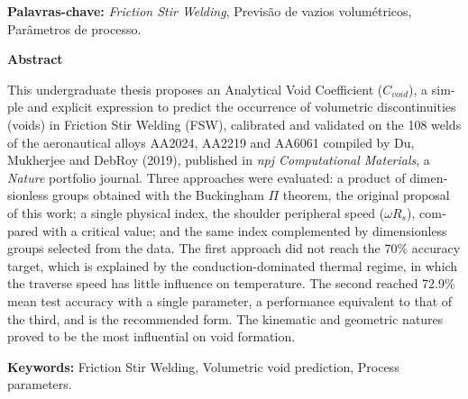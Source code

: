 \documentclass[12pt,openany]{report}
\begin{document}
\vspace{1.0cm}
\noindent \textbf{Palavras-chave:} \textit{Friction Stir Welding}, Previsão de vazios volumétricos, Parâmetros de processo.

\newpage


\vspace*{2.5cm}

\begin{center}
    {\fontsize{18}{22}\selectfont\bfseries Abstract\par}
\end{center}

\vspace{1.8cm}

\begin{otherlanguage}{english}
This undergraduate thesis proposes an Analytical Void Coefficient ($C_{void}$), a simple and explicit expression to predict the occurrence of volumetric discontinuities (voids) in Friction Stir Welding (FSW), calibrated and validated on the 108 welds of the aeronautical alloys AA2024, AA2219 and AA6061 compiled by Du, Mukherjee and DebRoy (2019), published in \textit{npj Computational Materials}, a \textit{Nature} portfolio journal. Three approaches were evaluated: a product of dimensionless groups obtained with the Buckingham $\Pi$ theorem, the original proposal of this work; a single physical index, the shoulder peripheral speed ($\omega R_s$), compared with a critical value; and the same index complemented by dimensionless groups selected from the data. The first approach did not reach the 70\% accuracy target, which is explained by the conduction-dominated thermal regime, in which the traverse speed has little influence on temperature. The second reached 72.9\% mean test accuracy with a single parameter, a performance equivalent to that of the third, and is the recommended form. The kinematic and geometric natures proved to be the most influential on void formation.

\vspace{1.0cm}
\noindent \textbf{Keywords:} Friction Stir Welding, Volumetric void prediction, Process parameters.
\end{otherlanguage}

\newpage
\end{document}
